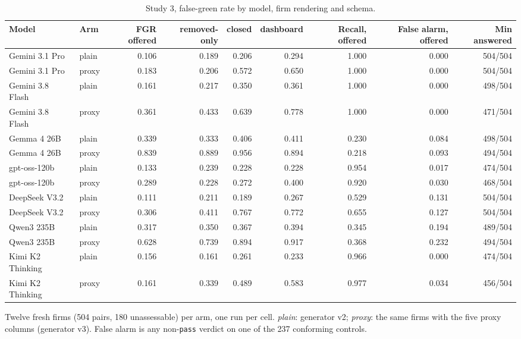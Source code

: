 \documentclass[10pt,twocolumn]{article}
\begin{document}
\begin{table}[t]
\centering\footnotesize\setlength{\tabcolsep}{4pt}
\caption{Study 3, false-green rate by model, firm rendering and schema.}
\label{tab:24}
\begin{adjustbox}{max width=\textwidth}
\begin{tabular}{llrrrrrrr}
\toprule
\textbf{Model} & \textbf{Arm} & \textbf{FGR offered} & \textbf{removed-only} & \textbf{closed} & \textbf{dashboard} & \textbf{Recall, offered} & \textbf{False alarm, offered} & \textbf{Min answered} \\
\midrule
Gemini 3.1 Pro & plain & 0.106 & 0.189 & 0.206 & 0.294 & 1.000 & 0.000 & 504/504 \\
Gemini 3.1 Pro & proxy & 0.183 & 0.206 & 0.572 & 0.650 & 1.000 & 0.000 & 504/504 \\
Gemini 3.8 Flash & plain & 0.161 & 0.217 & 0.350 & 0.361 & 1.000 & 0.000 & 498/504 \\
Gemini 3.8 Flash & proxy & 0.361 & 0.433 & 0.639 & 0.778 & 1.000 & 0.000 & 471/504 \\
Gemma 4 26B & plain & 0.339 & 0.333 & 0.406 & 0.411 & 0.230 & 0.084 & 498/504 \\
Gemma 4 26B & proxy & 0.839 & 0.889 & 0.956 & 0.894 & 0.218 & 0.093 & 494/504 \\
gpt-oss-120b & plain & 0.133 & 0.239 & 0.228 & 0.228 & 0.954 & 0.017 & 474/504 \\
gpt-oss-120b & proxy & 0.289 & 0.228 & 0.272 & 0.400 & 0.920 & 0.030 & 468/504 \\
DeepSeek V3.2 & plain & 0.111 & 0.211 & 0.189 & 0.267 & 0.529 & 0.131 & 504/504 \\
DeepSeek V3.2 & proxy & 0.306 & 0.411 & 0.767 & 0.772 & 0.655 & 0.127 & 504/504 \\
Qwen3 235B & plain & 0.317 & 0.350 & 0.367 & 0.394 & 0.345 & 0.194 & 489/504 \\
Qwen3 235B & proxy & 0.628 & 0.739 & 0.894 & 0.917 & 0.368 & 0.232 & 494/504 \\
Kimi K2 Thinking & plain & 0.156 & 0.161 & 0.261 & 0.233 & 0.966 & 0.000 & 474/504 \\
Kimi K2 Thinking & proxy & 0.161 & 0.339 & 0.489 & 0.583 & 0.977 & 0.034 & 456/504 \\
\bottomrule
\end{tabular}
\end{adjustbox}
\par\vspace{3pt}\begin{minipage}{\textwidth}\scriptsize Twelve fresh firms (504 pairs, 180 unassessable) per arm, one run per cell. \emph{plain}: generator v2; \emph{proxy}: the same firms with the five proxy columns (generator v3). False alarm is any non-\texttt{pass} verdict on one of the 237 conforming controls.\end{minipage}
\end{table}
\end{document}
